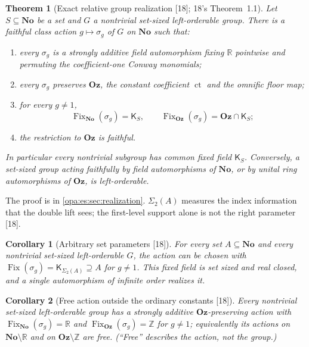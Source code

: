 \documentclass[11pt,oneside]{article}
\numberwithin{equation}{section}
\newtheorem{theorem}{Theorem}[section]
\newtheorem{corollary}[corollary]{Corollary}
\theoremstyle{definition}
\theoremstyle{remark}
\newcommand{\No}{\mathbf{No}}
\newcommand{\Oz}{\mathbf{Oz}}
\newcommand{\R}{\mathbb R}
\newcommand{\Z}{\mathbb Z}
\newcommand{\ct}{\operatorname{ct}}
\newcommand{\Fix}{\operatorname{Fix}}
\newcommand{\src}[1]{\textup{\textsf{\small[#1]}}}
\begin{document}
\begin{theorem}[Exact relative group realization \src{18}; 18's Theorem~1.1]\label{opa:es:thm:main}
Let $S\subseteq\No$ be a set and $G$ a nontrivial set-sized left-orderable group. There is a faithful class action
$g\mapsto\sigma_g$ of $G$ on $\No$ such that:
\begin{enumerate}[label=\textup{(\roman*)},itemsep=1pt]
\item every $\sigma_g$ is a strongly additive field automorphism fixing $\R$ pointwise and permuting the coefficient-one Conway
monomials;
\item every $\sigma_g$ preserves $\Oz$, the constant coefficient $\ct$ and the omnific floor map;
\item for every $g\ne1$,
\begin{equation}\label{opa:es:eq:mainfixed}
 \Fix_{\No}(\sigma_g)=\mathsf K_S,\qquad \Fix_{\Oz}(\sigma_g)=\Oz\cap\mathsf K_S;
\end{equation}
\item the restriction to $\Oz$ is faithful.
\end{enumerate}
In particular every nontrivial subgroup has common fixed field $\mathsf K_S$. Conversely, a set-sized group acting faithfully by
field automorphisms of $\No$, or by unital ring automorphisms of $\Oz$, is left-orderable.
\end{theorem}

The proof is in \cref{opa:es:sec:realization}. $\Sigma_2(A)$ measures the index information that the double lift sees; the
first-level support alone is not the right parameter \src{18}.

\begin{corollary}[Arbitrary set parameters \src{18}]\label{opa:es:cor:parameters}
For every set $A\subseteq\No$ and every nontrivial set-sized left-orderable $G$, the action can be chosen with
$\Fix(\sigma_g)=\mathsf K_{\Sigma_2(A)}\supseteq A$ for $g\ne1$. This fixed field is set sized and real closed, and a single automorphism
of infinite order realizes it.
\end{corollary}

\begin{corollary}[Free action outside the ordinary constants \src{18}]\label{opa:es:cor:ordinary}
Every nontrivial set-sized left-orderable group has a strongly additive $\Oz$-preserving action with $\Fix_{\No}(\sigma_g)=\R$ and
$\Fix_{\Oz}(\sigma_g)=\Z$ for $g\ne1$; equivalently its actions on $\No\setminus\R$ and on $\Oz\setminus\Z$ are free. (``Free'' describes
the action, not the group.)
\end{corollary}
\end{document}
